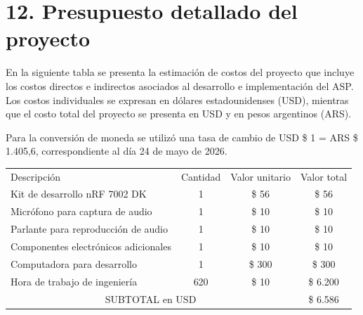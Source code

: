 \documentclass[
11pt, %
]{charter}
\begin{document}
\section{12. Presupuesto detallado del proyecto}
\label{sec:presupuesto}


En la siguiente tabla se presenta la estimación de costos del proyecto que incluye los costos directos e indirectos asociados al desarrollo e implementación del ASP. Los costos individuales se expresan en dólares estadounidenses (USD), mientras que el costo total del proyecto se presenta en USD y en pesos argentinos (ARS).

Para la conversión de moneda se utilizó una tasa de cambio de USD \$ 1 = ARS \$ 1.405,6, correspondiente al día 24 de mayo de 2026.


\begin{table}[htpb]
\centering
\begin{tabularx}{\linewidth}{@{}|X|c|r|r|@{}}
\hline
\rowcolor[HTML]{C0C0C0} 
\multicolumn{4}{|c|}{\cellcolor[HTML]{C0C0C0}COSTOS DIRECTOS} \\ \hline
\rowcolor[HTML]{C0C0C0} 
Descripción &
  \multicolumn{1}{c|}{\cellcolor[HTML]{C0C0C0}Cantidad} &
  \multicolumn{1}{c|}{\cellcolor[HTML]{C0C0C0}Valor unitario} &
  \multicolumn{1}{c|}{\cellcolor[HTML]{C0C0C0}Valor total} \\ \hline

Kit de desarrollo nRF 7002 DK &
  \multicolumn{1}{c|}{1} &
  \multicolumn{1}{c|}{ \$ 56} &
  \multicolumn{1}{c|}{ \$ 56} \\ \hline
Micrófono para captura de audio &
  \multicolumn{1}{c|}{1} &
  \multicolumn{1}{c|}{\$ 10} &
  \multicolumn{1}{c|}{\$ 10} \\ \hline
Parlante para reproducción de audio &
  \multicolumn{1}{c|}{1} &
  \multicolumn{1}{c|}{\$ 10} &
  \multicolumn{1}{c|}{\$ 10} \\ \hline
Componentes electrónicos adicionales &
  \multicolumn{1}{c|}{1} &
  \multicolumn{1}{c|}{\$ 10} &
  \multicolumn{1}{c|}{\$ 10} \\ \hline
Computadora para desarrollo &
  \multicolumn{1}{c|}{1} &
  \multicolumn{1}{c|}{\$ 300} &
  \multicolumn{1}{c|}{\$ 300} \\ \hline  
Hora de trabajo de ingeniería &
  \multicolumn{1}{c|}{620} &
  \multicolumn{1}{c|}{\$ 10} &
  \multicolumn{1}{c|}{\$ 6.200} \\ \hline
  

\multicolumn{3}{|c|}{SUBTOTAL en USD} &
  \multicolumn{1}{c|}{\$ 6.586} \\ \hline


\end{tabularx}
\end{table}
\end{document}
